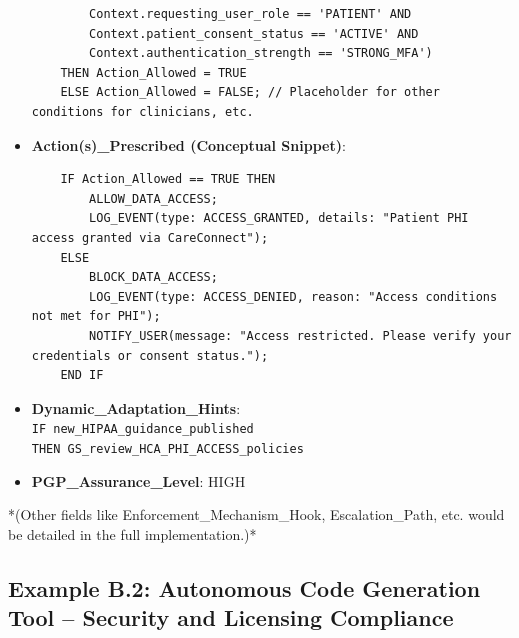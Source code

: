 \documentclass[sigconf,review,anonymous=false]{acmart} %
\begin{document}
\begin{itemize}
{\begin{verbatim}
        Context.requesting_user_role == 'PATIENT' AND
        Context.patient_consent_status == 'ACTIVE' AND
        Context.authentication_strength == 'STRONG_MFA')
    THEN Action_Allowed = TRUE
    ELSE Action_Allowed = FALSE; // Placeholder for other conditions for clinicians, etc.
    \end{verbatim}
    }
    \item \textbf{Action(s)\_Prescribed (Conceptual Snippet)}:
    {\footnotesize
    \begin{verbatim}
    IF Action_Allowed == TRUE THEN
        ALLOW_DATA_ACCESS;
        LOG_EVENT(type: ACCESS_GRANTED, details: "Patient PHI access granted via CareConnect");
    ELSE
        BLOCK_DATA_ACCESS;
        LOG_EVENT(type: ACCESS_DENIED, reason: "Access conditions not met for PHI");
        NOTIFY_USER(message: "Access restricted. Please verify your credentials or consent status.");
    END IF
    \end{verbatim}
    }
    \item \textbf{Dynamic\_Adaptation\_Hints}: \\
    \texttt{IF new\_HIPAA\_guidance\_published} \\
    \texttt{THEN GS\_review\_HCA\_PHI\_ACCESS\_policies}
    \item \textbf{PGP\_Assurance\_Level}: HIGH
\end{itemize}
*(Other fields like Enforcement\_Mechanism\_Hook, Escalation\_Path, etc. would be detailed in the full implementation.)*

\subsection{Example B.2: Autonomous Code Generation Tool – Security and Licensing Compliance}
\label{app:policy_example_codegen}
\end{document}
